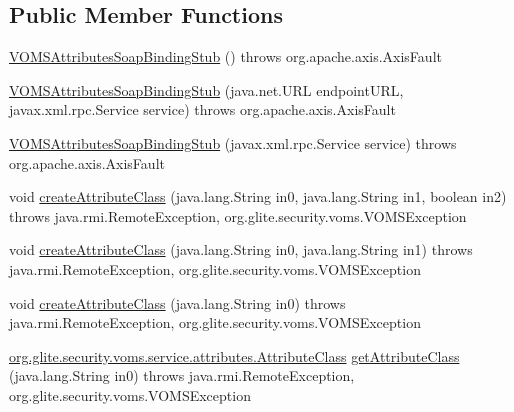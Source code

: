 \subsection*{Public Member Functions}
\begin{DoxyCompactItemize}
\item 
\hyperlink{classorg_1_1glite_1_1security_1_1voms_1_1service_1_1attributes_1_1VOMSAttributesSoapBindingStub_a1d9c61fbdc417e52ccfaf398f94b9584}{VOMSAttributesSoapBindingStub} ()  throws org.apache.axis.AxisFault 
\item 
\hyperlink{classorg_1_1glite_1_1security_1_1voms_1_1service_1_1attributes_1_1VOMSAttributesSoapBindingStub_a0be5cfbc45c15dded632a2631208e613}{VOMSAttributesSoapBindingStub} (java.net.URL endpointURL, javax.xml.rpc.Service service)  throws org.apache.axis.AxisFault 
\item 
\hyperlink{classorg_1_1glite_1_1security_1_1voms_1_1service_1_1attributes_1_1VOMSAttributesSoapBindingStub_a7acf342146657ca2895c469980690ad7}{VOMSAttributesSoapBindingStub} (javax.xml.rpc.Service service)  throws org.apache.axis.AxisFault 
\item 
void \hyperlink{classorg_1_1glite_1_1security_1_1voms_1_1service_1_1attributes_1_1VOMSAttributesSoapBindingStub_a3619ce6106bf3126e4cb575bcd476d70}{createAttributeClass} (java.lang.String in0, java.lang.String in1, boolean in2)  throws java.rmi.RemoteException, org.glite.security.voms.VOMSException 
\item 
void \hyperlink{classorg_1_1glite_1_1security_1_1voms_1_1service_1_1attributes_1_1VOMSAttributesSoapBindingStub_af980e4a576023b1d8384c413fa2edf15}{createAttributeClass} (java.lang.String in0, java.lang.String in1)  throws java.rmi.RemoteException, org.glite.security.voms.VOMSException 
\item 
void \hyperlink{classorg_1_1glite_1_1security_1_1voms_1_1service_1_1attributes_1_1VOMSAttributesSoapBindingStub_a5373739d4f4c7730da8295b4a7fa679f}{createAttributeClass} (java.lang.String in0)  throws java.rmi.RemoteException, org.glite.security.voms.VOMSException 
\item 
\hyperlink{classorg_1_1glite_1_1security_1_1voms_1_1service_1_1attributes_1_1AttributeClass}{org.glite.security.voms.service.attributes.AttributeClass} \hyperlink{classorg_1_1glite_1_1security_1_1voms_1_1service_1_1attributes_1_1VOMSAttributesSoapBindingStub_a51668c82e91658d52764c266109c6d47}{getAttributeClass} (java.lang.String in0)  throws java.rmi.RemoteException, org.glite.security.voms.VOMSException 
\item 

\end{DoxyCompactItemize}
